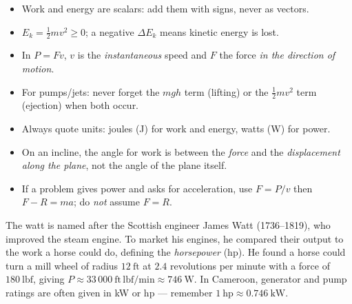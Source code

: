 \documentclass[11pt]{article}
\begin{document}
\begin{attention}
\begin{itemize}
\item Work and energy are scalars: add them with signs, never as vectors.
\item $E_k = \frac{1}{2}mv^2 \ge 0$; a negative $\Delta E_k$ means kinetic energy is lost.
\item In $P = Fv$, $v$ is the \emph{instantaneous} speed and $F$ the force \emph{in the direction of motion}.
\item For pumps/jets: never forget the $mgh$ term (lifting) or the $\frac{1}{2}mv^2$ term (ejection) when both occur.
\item Always quote units: joules (J) for work and energy, watts (W) for power.
\item On an incline, the angle for work is between the \emph{force} and the \emph{displacement along the plane}, not the angle of the plane itself.
\item If a problem gives power and asks for acceleration, use $F = P/v$ then $F - R = ma$; do \emph{not} assume $F = R$.
\end{itemize}
\end{attention}

\begin{savaistu}
The watt is named after the Scottish engineer James Watt (1736–1819), who improved the steam engine. To market his engines, he compared their output to the work a horse could do, defining the \emph{horsepower} (hp). He found a horse could turn a mill wheel of radius $12\ \mathrm{ft}$ at $2.4$ revolutions per minute with a force of $180\ \mathrm{lbf}$, giving $P \approx 33\,000\ \mathrm{ft\,lbf/min} \approx 746\ \mathrm{W}$. In Cameroon, generator and pump ratings are often given in kW or hp — remember $1\ \mathrm{hp} \approx 0.746\ \mathrm{kW}$.
\end{savaistu}
\end{document}
